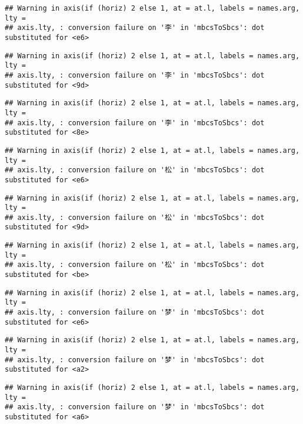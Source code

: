\documentclass[
]{article}
\begin{document}
\begin{verbatim}
## Warning in axis(if (horiz) 2 else 1, at = at.l, labels = names.arg, lty =
## axis.lty, : conversion failure on '李' in 'mbcsToSbcs': dot substituted for <e6>
\end{verbatim}

\begin{verbatim}
## Warning in axis(if (horiz) 2 else 1, at = at.l, labels = names.arg, lty =
## axis.lty, : conversion failure on '李' in 'mbcsToSbcs': dot substituted for <9d>
\end{verbatim}

\begin{verbatim}
## Warning in axis(if (horiz) 2 else 1, at = at.l, labels = names.arg, lty =
## axis.lty, : conversion failure on '李' in 'mbcsToSbcs': dot substituted for <8e>
\end{verbatim}

\begin{verbatim}
## Warning in axis(if (horiz) 2 else 1, at = at.l, labels = names.arg, lty =
## axis.lty, : conversion failure on '松' in 'mbcsToSbcs': dot substituted for <e6>
\end{verbatim}

\begin{verbatim}
## Warning in axis(if (horiz) 2 else 1, at = at.l, labels = names.arg, lty =
## axis.lty, : conversion failure on '松' in 'mbcsToSbcs': dot substituted for <9d>
\end{verbatim}

\begin{verbatim}
## Warning in axis(if (horiz) 2 else 1, at = at.l, labels = names.arg, lty =
## axis.lty, : conversion failure on '松' in 'mbcsToSbcs': dot substituted for <be>
\end{verbatim}

\begin{verbatim}
## Warning in axis(if (horiz) 2 else 1, at = at.l, labels = names.arg, lty =
## axis.lty, : conversion failure on '梦' in 'mbcsToSbcs': dot substituted for <e6>
\end{verbatim}

\begin{verbatim}
## Warning in axis(if (horiz) 2 else 1, at = at.l, labels = names.arg, lty =
## axis.lty, : conversion failure on '梦' in 'mbcsToSbcs': dot substituted for <a2>
\end{verbatim}

\begin{verbatim}
## Warning in axis(if (horiz) 2 else 1, at = at.l, labels = names.arg, lty =
## axis.lty, : conversion failure on '梦' in 'mbcsToSbcs': dot substituted for <a6>
\end{verbatim}
\end{document}
